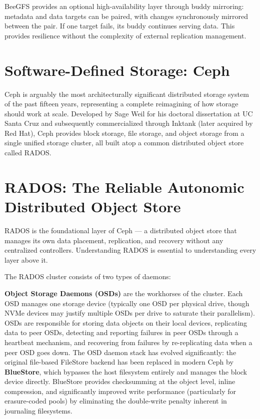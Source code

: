BeeGFS provides an optional high-availability layer through buddy mirroring: metadata and data targets can be paired, with changes synchronously mirrored between the pair. If one target fails, its buddy continues serving data. This provides resilience without the complexity of external replication management.

\section{Software-Defined Storage: Ceph}
Ceph is arguably the most architecturally significant distributed storage system of the past fifteen years, representing a complete reimagining of how storage should work at scale. Developed by Sage Weil for his doctoral dissertation at UC Santa Cruz and subsequently commercialized through Inktank (later acquired by Red Hat), Ceph provides block storage, file storage, and object storage from a single unified storage cluster, all built atop a common distributed object store called RADOS.

\section{RADOS: The Reliable Autonomic Distributed Object Store}
RADOS is the foundational layer of Ceph --- a distributed object store that manages its own data placement, replication, and recovery without any centralized controllers. Understanding RADOS is essential to understanding every layer above it.

The RADOS cluster consists of two types of daemons:

\textbf{Object Storage Daemons (OSDs)} are the workhorses of the cluster. Each OSD manages one storage device (typically one OSD per physical drive, though NVMe devices may justify multiple OSDs per drive to saturate their parallelism). OSDs are responsible for storing data objects on their local devices, replicating data to peer OSDs, detecting and reporting failures in peer OSDs through a heartbeat mechanism, and recovering from failures by re-replicating data when a peer OSD goes down. The OSD daemon stack has evolved significantly: the original file-based FileStore backend has been replaced in modern Ceph by \textbf{BlueStore}, which bypasses the host filesystem entirely and manages the block device directly. BlueStore provides checksumming at the object level, inline compression, and significantly improved write performance (particularly for erasure-coded pools) by eliminating the double-write penalty inherent in journaling filesystems.

